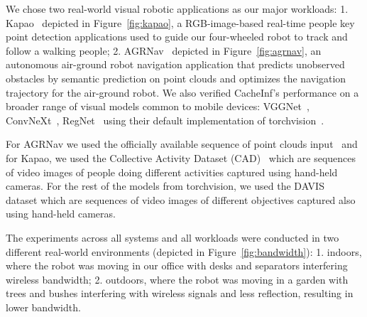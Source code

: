 We chose two real-world visual robotic applications as our major workloads: 1. Kapao~\cite{kapao} depicted in Figure~\ref{fig:kapao}, a RGB-image-based real-time people key point detection applications used to guide our four-wheeled robot to track and follow a walking people;
2. AGRNav~\cite{agrnav} depicted in Figure~\ref{fig:agrnav}, an autonomous air-ground robot navigation application that predicts unobserved obstacles by semantic prediction on point clouds and optimizes the navigation trajectory for the air-ground robot.
We also verified CacheInf's performance on a broader range of visual models common to mobile devices: VGGNet~\cite{simonyan2015deep}, ConvNeXt~\cite{woo2023convnext}, RegNet~\cite{xu2022regnet} using their default implementation of torchvision~\cite{noauthor_torchvision_nodate}. 

For AGRNav we used the officially available sequence of point clouds input~\cite{agrnav} and for Kapao, we used the Collective Activity Dataset (CAD)~\cite{Choi_VSWS_2009} which are sequences of video images of people doing different activities captured using hand-held cameras.
For the rest of the models from torchvision, we used the DAVIS~\cite{Perazzi2016} dataset which are sequences of video images of different objectives captured also using hand-held cameras.

The experiments across all systems and all workloads were conducted in two different real-world environments (depicted in Figure~\ref{fig:bandwidth}): 1. indoors, where the robot was moving in our office with desks and separators interfering wireless bandwidth;
2. outdoors, where the robot was moving in a garden with trees and bushes interfering with wireless signals and less reflection, resulting in lower bandwidth. 

